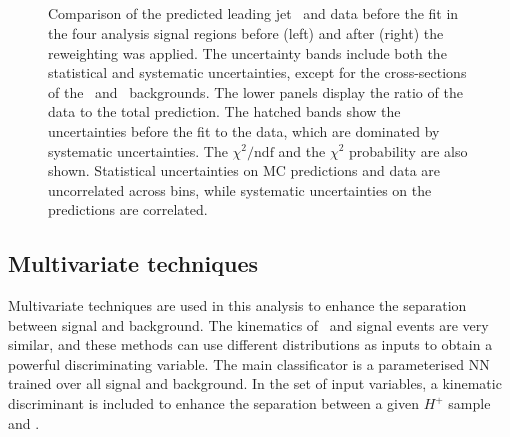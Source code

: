 \begin{figure}[htb]
    \RawFloats
    \begin{center}
     \\
       \\
      \\ 
      \\  
    \caption{Comparison of the predicted leading jet \pT\ and data before the fit in the four analysis signal regions before (left) and after (right) the reweighting was applied. The uncertainty bands include both the statistical and systematic uncertainties, except for the cross-sections of the \ttb\ and \ttc\ backgrounds.
    The lower panels display the ratio of the data to the total prediction. 
    The hatched bands show the uncertainties before the fit to the data,  which are dominated by systematic uncertainties. The $\chi^2/\mathrm{ndf}$ and the $\chi^2$ probability are also shown. Statistical uncertainties on MC predictions and data are uncorrelated across bins, while systematic uncertainties on the predictions are correlated.}
    \label{Hplustb:RWeffect}
\end{center}
\end{figure}
\clearpage
\subsection{Multivariate techniques}

Multivariate techniques are used in this analysis to enhance the separation between signal and background. The kinematics of \ttb\ and signal events are very similar, and these methods can use different distributions as inputs to obtain a powerful discriminating variable. The main classificator is a parameterised NN trained over all signal and background. In the set of input variables, a kinematic discriminant is included to enhance the separation between a given $H^+$ sample and \ttjets.

